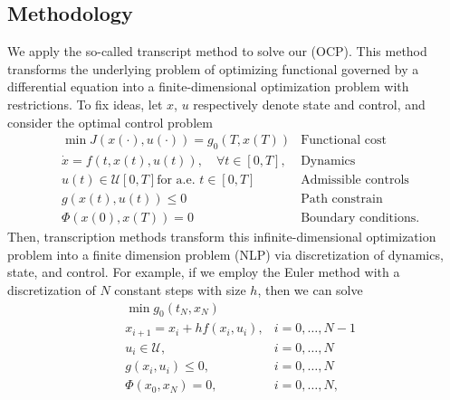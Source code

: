 \subsection{Methodology}
        We apply the so-called transcript method to solve our (OCP).
    This method transforms the underlying problem of
    optimizing functional governed by a differential equation into a
    finite-dimensional optimization problem with restrictions. To fix ideas,
    let $x$, $u$ respectively denote state and control, and consider the
    optimal control problem
    \begin{equation*}
        \begin{aligned}
                & \min J(x(\cdot), u(\cdot)) = g_0(T, x(T))
                & \text{Functional cost}
            \\
                & \dot{x} = f(t, x(t), u(t)),
                \quad\forall t \in [0, T],
                & \text{Dynamics}
            \\
                & u(t) \in \mathcal{U}[0, T] \text{for a.e. } t\in [0, T]
                & \text{Admissible controls}
            \\
                & g(x(t), u(t)) \leq 0
                & \text{Path constrain}
            \\
                & \Phi(x(0), x(T)) = 0
                & \text{Boundary conditions}.
        \end{aligned}
    \end{equation*}
        Then, transcription methods transform this infinite-dimensional
    optimization problem into a finite dimension problem (NLP) via
    discretization of dynamics, state, and control.  For example, if we
    employ the Euler method with a discretization of $N$ constant steps with
    size $h$, then we can solve
        \begin{equation}
            \label{eqn:nlp}
            \begin{aligned}
                    &\min g_0(t_N, x_N)
                \\
                    &
                        x_{i+1} = x_i + h f(x_i, u_i),
                    & i = 0, \dots, N - 1
                \\
                    &
                        u_i \in \mathcal{U},
                    & i = 0, \dots, N
                \\
                    &
                        g(x_i, u_i) \leq 0,
                    & i = 0, \dots, N
                \\
                    &
                    \Phi(x_0, x_N) = 0,
                    &i = 0, \dots, N,
            \end{aligned}
        \end{equation}
